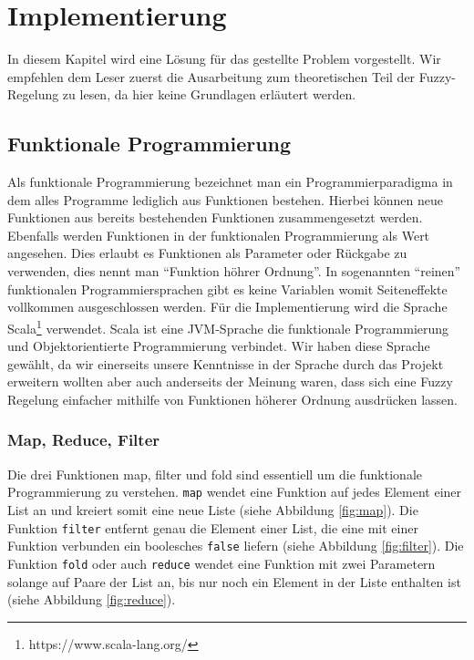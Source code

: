 \documentclass[12pt,a4paper,bibliography=totocnumbered,listof=totocnumbered, abstracton]{scrartcl}
\def\code#1{\texttt{#1}}
\theoremstyle{Umgebung}
\begin{document}
\section{Implementierung}

In diesem Kapitel wird eine Lösung für das gestellte Problem vorgestellt. Wir empfehlen dem Leser zuerst die Ausarbeitung zum theoretischen Teil der Fuzzy-Regelung zu lesen, da hier keine Grundlagen erläutert werden.

\subsection{Funktionale Programmierung}

Als funktionale Programmierung bezeichnet man ein Programmierparadigma in dem alles Programme lediglich aus Funktionen bestehen. Hierbei können neue Funktionen aus bereits bestehenden Funktionen zusammengesetzt werden. Ebenfalls werden Funktionen in der funktionalen Programmierung als Wert angesehen. Dies erlaubt es Funktionen als Parameter oder Rückgabe zu verwenden, dies nennt man \enquote{Funktion höhrer Ordnung}. In sogenannten \enquote{reinen} funktionalen Programmiersprachen gibt es keine Variablen womit Seiteneffekte vollkommen ausgeschlossen werden. Für die Implementierung wird die Sprache Scala\footnote{https://www.scala-lang.org/} verwendet. Scala ist eine JVM-Sprache die funktionale Programmierung und Objektorientierte Programmierung verbindet. Wir haben diese Sprache gewählt, da wir einerseits unsere Kenntnisse in der Sprache durch das Projekt erweitern wollten aber auch anderseits der Meinung waren, dass sich eine Fuzzy Regelung einfacher mithilfe von Funktionen höherer Ordnung ausdrücken lassen.

\subsubsection{Map, Reduce, Filter}

Die drei Funktionen map, filter und fold sind essentiell um die funktionale Programmierung zu verstehen. \code{map} wendet eine Funktion auf jedes Element einer List an und kreiert somit eine neue Liste (siehe Abbildung \ref{fig:map}). Die Funktion \code{filter} entfernt genau die Element einer List, die eine mit einer Funktion verbunden ein boolesches \code{false} liefern (siehe Abbildung \ref{fig:filter}). Die Funktion \code{fold} oder auch \code{reduce} wendet eine Funktion mit zwei Parametern solange auf Paare der List an, bis nur noch ein Element in der Liste enthalten ist (siehe Abbildung \ref{fig:reduce}).
\end{document}
